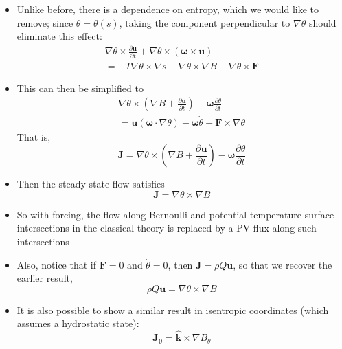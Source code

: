 \documentclass[30pt,landscape]{foils}
\newcommand{\pdiff}[2]{\frac{\partial #1}{\partial #2}}
\begin{document}
\begin{itemize}
  \item Unlike before, there is a dependence on entropy, which we would like to remove; since $\theta = \theta(s)$, taking the component perpendicular to $\nabla \theta$ should eliminate this effect:
  \begin{multline*}
  \nabla \theta \times \pdiff{\bm{u}}{t} + \nabla \theta \times \left(\bm{\omega} \times \bm{u}\right) \\ = -T \nabla \theta \times \nabla s - \nabla \theta \times \nabla B + \nabla \theta \times \bm{F}
  \end{multline*}

  \item This can then be simplified to
  \begin{multline*}
  \nabla \theta \times \left(\nabla B + \pdiff{\bm{u}}{t} \right) - \bm{\omega} \pdiff{\theta}{t} \\ = \bm{u} \left(\bm{\omega} \cdot \nabla \theta \right) - \bm{\omega} \dot{\theta} - \bm{F} \times \nabla \theta
  \end{multline*}
  That is,
  \begin{equation*}
  \bm{J} = \nabla \theta \times \left(\nabla B + \pdiff{\bm{u}}{t} \right) - \bm{\omega} \pdiff{\theta}{t}
  \end{equation*}

  \item Then the steady state flow satisfies
  \begin{equation*}
    \boxed{\bm{J} = \nabla \theta \times \nabla B}
  \end{equation*}

  \item So with forcing, the flow along Bernoulli and potential temperature surface intersections in the classical theory is replaced by a PV flux along such intersections

  \item Also, notice that if $\bm{F} = 0$ and $\dot{\theta} = 0$, then $\bm{J} = \rho Q \bm{u}$, so that we recover the earlier result,
  \begin{equation*}
    \rho Q \bm{u} = \nabla \theta \times \nabla B
  \end{equation*}

  \item It is also possible to show a similar result in isentropic coordinates (which assumes a hydrostatic state):
  \begin{equation*}
    \bm{J_\theta} = \hat{\bm{k}} \times \nabla B_\theta
  \end{equation*}

\end{itemize}
\end{document}
